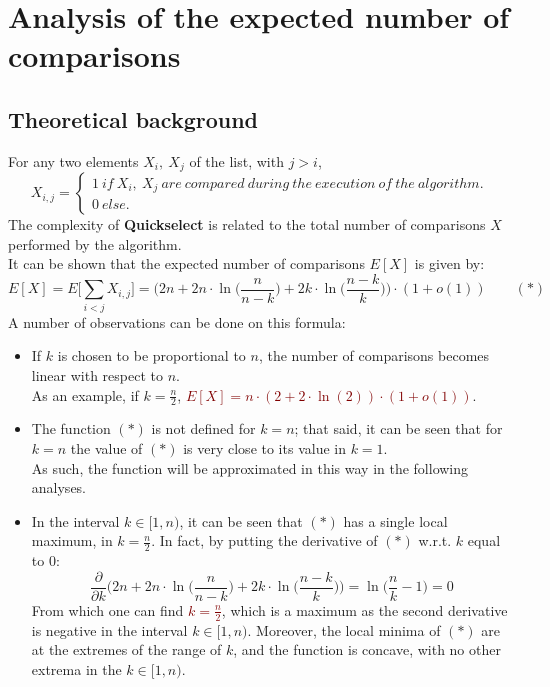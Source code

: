 \documentclass[
12pt,
a4paper,
oneside,
headinclude,
footinclude]{article}
\begin{document}
\section{Analysis of the expected number of comparisons}
\vspace{-5mm}
\subsection{Theoretical background}
\vspace{-5mm}
For any two elements $X_i,\ X_j$ of the list, with $j > i$, \\
\[
    X_{i,j} = \begin{cases}
                    1\ if\ X_i,\ X_j\ are\ compared\ during\ the\ execution\ of\ the\ algorithm. \\
                    0\ else.
                \end{cases}
\]
The complexity of \textbf{Quickselect} is related to the total number of comparisons $X$ performed by the algorithm.\\
It can be shown that the expected number of comparisons $E[X]$ is given by:
$$E[X] = E\Big[\sum_{i < j}{X_{i,j}}\Big] = \Big(2n + 2n \cdot\ln\Big(\frac{n}{n - k}\Big) + 2k \cdot\ln\Big(\frac{n - k}{k}\Big)\Big)\cdot (1 + o(1)) \quad\quad (\ast)$$
\vspace{-5mm}
A number of observations can be done on this formula:
\begin{itemize}
    \item If $k$ is chosen to be proportional to $n$, the number of comparisons becomes linear with respect to $n$.\\
    As an example, if $k = \frac{n}{2}$, \textcolor{Maroon}{$E[X] = n \cdot (2 + 2 \cdot \ln(2)) \cdot (1 + o(1))$}.

    \item The function $(\ast)$ is not defined for $k = n$; that said, it can be seen that for $k = n$ the value of $(\ast)$ is very close to its value in $k = 1$. \\
        As such, the function will be approximated in this way in the following analyses.

    \item In the interval $k \in [1, n)$, it can be seen that $(\ast)$ has a single local maximum, in $k = \frac{n}{2}$. In fact, by putting the derivative of $(\ast)$ w.r.t. $k$ equal to $0$: $$\frac{\partial}{\partial k}\Big(2n + 2n \cdot\ln\Big(\frac{n}{n - k}\Big) + 2k \cdot\ln\Big(\frac{n - k}{k}\Big)\Big) = \ln\Big(\frac{n}{k} - 1 \Big) = 0$$
    From which one can find \textcolor{Maroon}{$k = \frac{n}{2}$}, which is a maximum as the second derivative is negative in the interval $k \in [1, n)$.
    Moreover, the local minima of $(\ast)$ are at the extremes of the range of $k$, and the function is concave, with no other extrema in the $k\in[1, n)$.
\end{itemize}
\end{document}
